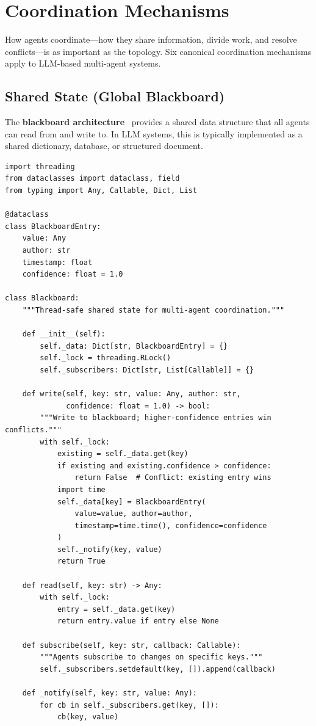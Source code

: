 \section{Coordination Mechanisms}
\label{subsec:coordination-mechanisms}

How agents coordinate---how they share information, divide work, and resolve conflicts---is as important as the topology. Six canonical coordination mechanisms apply to LLM-based multi-agent systems.

\subsection{Shared State (Global Blackboard)}
\label{subsubsec:shared-state}

The \textbf{blackboard architecture}~\cite{hayes1985blackboard} provides a shared data structure that all agents can read from and write to. In LLM systems, this is typically implemented as a shared dictionary, database, or structured document.

\begin{lstlisting}[style=pythonstyle, caption={Shared blackboard with conflict resolution}]
import threading
from dataclasses import dataclass, field
from typing import Any, Callable, Dict, List

@dataclass
class BlackboardEntry:
    value: Any
    author: str
    timestamp: float
    confidence: float = 1.0

class Blackboard:
    """Thread-safe shared state for multi-agent coordination."""

    def __init__(self):
        self._data: Dict[str, BlackboardEntry] = {}
        self._lock = threading.RLock()
        self._subscribers: Dict[str, List[Callable]] = {}

    def write(self, key: str, value: Any, author: str,
              confidence: float = 1.0) -> bool:
        """Write to blackboard; higher-confidence entries win conflicts."""
        with self._lock:
            existing = self._data.get(key)
            if existing and existing.confidence > confidence:
                return False  # Conflict: existing entry wins
            import time
            self._data[key] = BlackboardEntry(
                value=value, author=author,
                timestamp=time.time(), confidence=confidence
            )
            self._notify(key, value)
            return True

    def read(self, key: str) -> Any:
        with self._lock:
            entry = self._data.get(key)
            return entry.value if entry else None

    def subscribe(self, key: str, callback: Callable):
        """Agents subscribe to changes on specific keys."""
        self._subscribers.setdefault(key, []).append(callback)

    def _notify(self, key: str, value: Any):
        for cb in self._subscribers.get(key, []):
            cb(key, value)
\end{lstlisting}

